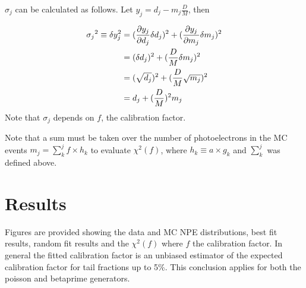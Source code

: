 \documentclass[12pt]{article}
\begin{document}
$\sigma_j$ can be calculated as follows. Let $y_j = d_j - m_j\frac{D}{M}$, then

\begin{eqnarray}
\sigma_{\color{black}j}^{\color{black}2} \equiv \delta y_j^2 &= (\frac{\partial y_j}{\partial d_j} \delta d_j)^2 + (\frac{\partial y_j}{\partial m_j} \delta m_j)^2  \\
                    &=(\delta d_j)^2 + (\frac{D}{M} \delta m_j)^2 \\
                    &=(\sqrt{d_j})^2 + (\frac{D}{M} \sqrt{m_j})^2 \\
                    &= d_j + (\frac{D}{M})^2 m_j
\end{eqnarray}
Note that $\sigma_j$ depends on $f$, the calibration factor. 

Note that a sum must be taken over the number of photoelectrons in the MC events  $m_j  = \sum_k^j f\times h_k$ to evaluate $\chi^2(f)$, 
where $h_k \equiv a\times g_k$ and $\sum_k^j$ was defined above.



\clearpage
\section{Results}
Figures are provided showing the data and MC NPE distributions, best fit results, random fit results and the $\chi^2(f)$ where $f$ the calibration factor.
In general the fitted calibration factor is an unbiased estimator of the expected calibration factor for tail fractions up to 5\%. 
This conclusion applies for both the poisson and betaprime generators.



\clearpage

\clearpage





\end{document}
